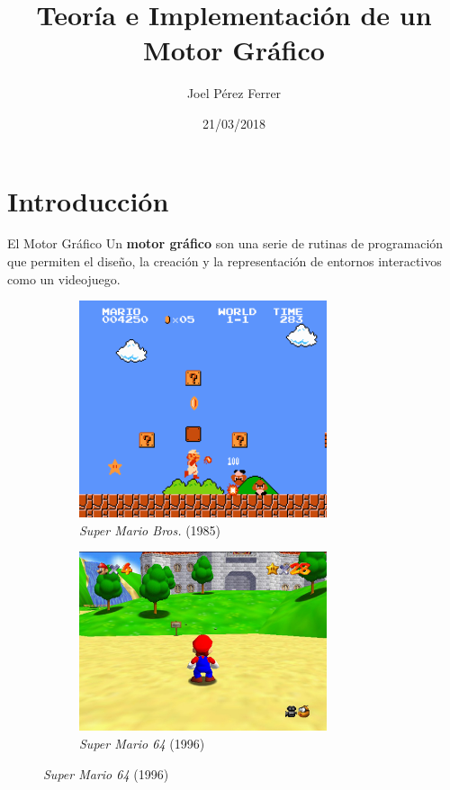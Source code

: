 \documentclass{beamer}
\title[T. e I. de un Motor Gráfico]{Teoría e Implementación de un Motor Gráfico}
\author{Joel Pérez Ferrer}
\institute{Institut de Bruguers}
\date{21/03/2018}
\begin{document}
\begin{frame}
  \titlepage
\end{frame}

\section{Introducción}
\begin{frame}{El Motor Gráfico}
  Un \textbf{motor gráfico} son una serie de rutinas de programación que permiten el diseño, la creación y la representación de entornos interactivos como un videojuego.
  
\begin{figure} [h]
  \centering
  \captionsetup[subfigure]{justification=centering}
  \begin{subfigure}{0.4\textwidth}
    \centering
    \includegraphics[width=0.8\textwidth]{img/supermario} 
    \caption{\textit{Super Mario Bros.} (1985)}
  \end{subfigure}
  \begin{subfigure}{0.4\textwidth}
    \centering
    \includegraphics[width=0.8\textwidth]{img/mario64} 
    \caption{\textit{Super Mario 64} (1996)}
  \end{subfigure}
\end{figure}
\end{frame}
\end{document}
